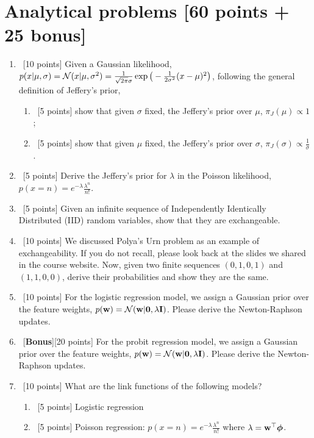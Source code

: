 \documentclass[12pt, fullpage,letterpaper]{article}
\begin{document}
\section*{Analytical problems [60 points + 25 bonus]}	
\label{sec:q1}
\begin{enumerate}
\item~[10 points] Given a Gaussian likelihood, $p(x|\mu, \sigma)=\mathcal{N}(x|\mu, \sigma^2)=\frac{1}{\sqrt{2\pi}\sigma}\exp\big(-\frac{1}{2\sigma^2}(x-\mu)^2\big)$,  following the general definition of Jeffery's prior, 
\begin{enumerate}
	\item~[5 points] show that given $\sigma$ fixed, the Jeffery's prior over $\mu$, $\pi_J(\mu) \propto 1$;
	\item~[5 points] show that given $\mu$ fixed, the Jeffery's prior over $\sigma$, $\pi_J(\sigma) \propto \frac{1}{\sigma}$.
\end{enumerate}

\item~[5 points] Derive the Jeffery's prior for $\lambda$ in the Poisson likelihood, $p(x=n) = e^{-\lambda}\frac{\lambda^n}{n!}$.

\item~[5 points] Given an infinite sequence of Independently Identically Distributed (IID) random variables, show that they  are exchangeable. 


\item~[10 points] We discussed Polya's Urn  problem as an example of exchangeability. If you do  not recall, please look back at the slides we shared in the course website. Now, given  two finite sequences $(0, 1, 0, 1)$ and $(1,1, 0, 0)$,  derive their probabilities and show they are the same. 

\item~[10 points] For the logistic regression model, we assign a Gaussian prior over the feature weights,  $p({\bf w}) = \mathcal{N}({\bf w}|{\bf 0}, \lambda{\bf I})$. Please derive the Newton-Raphson updates. 

\item~[\textbf{Bonus}][20 points]  For the probit regression model, we assign a Gaussian prior over the feature weights,  $p({\bf w}) = \mathcal{N}({\bf w}|{\bf 0}, \lambda{\bf I})$. Please derive the Newton-Raphson updates. 
   
\item~[10 points] What are the link functions of the following models?
\begin{enumerate}
	\item~[5 points] Logistic regression
	\item~[5 points] Poisson regression: $p(x=n) = e^{-\lambda}\frac{\lambda^n}{n!}$ where $\lambda = {\bf w}^\top \boldsymbol{\phi}$. 
\end{enumerate}


\end{enumerate}
\end{document}
